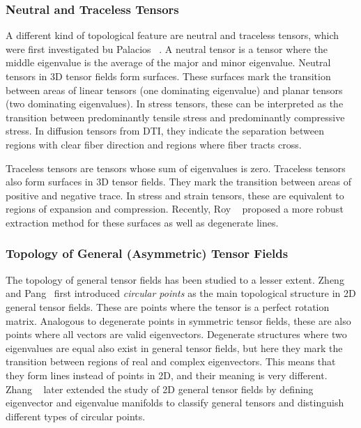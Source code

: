 \subsubsection{Neutral and Traceless Tensors} %
%
A different kind of topological feature are neutral and traceless tensors,
which were first investigated bu Palacios \etal~\cite{Palacios2016}.
%
A neutral tensor is a tensor where the middle eigenvalue is the average of the
major and minor eigenvalue.
%
Neutral tensors in \ac{3D} tensor fields form surfaces.
%
These surfaces mark the transition between areas of linear tensors (one
dominating eigenvalue) and planar tensors (two dominating eigenvalues).
%
In stress tensors, these can be interpreted as the transition between
predominantly tensile stress and predominantly compressive stress.
%
In diffusion tensors from \ac{DTI}, they indicate the separation between
regions with clear fiber direction and regions where fiber tracts cross.
%

%
Traceless tensors are tensors whose sum of eigenvalues is zero.
%
Traceless tensors also form surfaces in \ac{3D} tensor fields.
%
They mark the transition between areas of positive and negative trace.
%
In stress and strain tensors, these are equivalent to regions of expansion and
compression.
%
Recently, Roy \etal~\cite{Roy2019} proposed a more robust extraction method for
these surfaces as well as degenerate lines.
%

\subsubsection{Topology of General (Asymmetric) Tensor Fields} %
%
The topology of general tensor fields has been studied to a lesser extent.
%
Zheng and Pang~\cite{Zheng2005a} first introduced \emph{circular points} as the
main topological structure in \ac{2D} general tensor fields.
%
These are points where the tensor is a perfect rotation matrix.
%
Analogous to degenerate points in symmetric tensor fields, these are also points
where all vectors are valid eigenvectors.
%
Degenerate structures where two eigenvalues are equal also exist in general
tensor fields, but here they mark the transition between regions of real and
complex eigenvectors.
%
This means that they form lines instead of points in \ac{2D}, and their meaning
is very different.
%
Zhang \etal~\cite{Zhang2009} later extended the study of \ac{2D} general tensor
fields by defining eigenvector and eigenvalue manifolds to classify general
tensors and distinguish different types of circular points.
%
%
%

